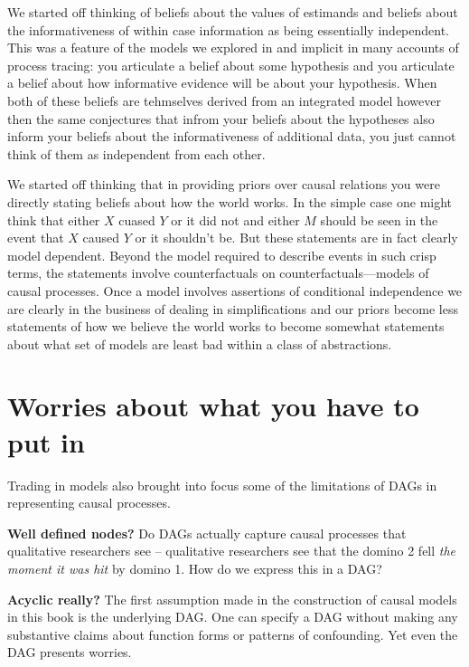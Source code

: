 \documentclass[12pt,]{book}
\begin{document}
We started off thinking of beliefs about the values of estimands and beliefs about the informativeness of within case information as being essentially independent. This was a feature of the models we explored in \citet{humphreys2015mixing} and implicit in many accounts of process tracing: you articulate a belief about some hypothesis and you articulate a belief about how informative evidence will be about your hypothesis. When both of these beliefs are tehmselves derived from an integrated model however then the same conjectures that infrom your beliefs about the hypotheses also inform your beliefs about the informativeness of additional data, you just cannot think of them as independent from each other.

We started off thinking that in providing priors over causal relations you were directly stating beliefs about how the world works. In the simple case one might think that either \(X\) cuased \(Y\) or it did not and either \(M\) should be seen in the event that \(X\) caused \(Y\) or it shouldn't be. But these statements are in fact clearly model dependent. Beyond the model required to describe events in such crisp terms, the statements involve counterfactuals on counterfactuals---models of causal processes. Once a model involves assertions of conditional independence we are clearly in the business of dealing in simplifications and our priors become less statements of how we believe the world works to become somewhat statements about what set of models are least bad within a class of abstractions.

\hypertarget{worries-about-what-you-have-to-put-in}{%
\section{Worries about what you have to put in}\label{worries-about-what-you-have-to-put-in}}

Trading in models also brought into focus some of the limitations of DAGs in representing causal processes.

\textbf{Well defined nodes?} Do DAGs actually capture causal processes that qualitative researchers see -- qualitative researchers see that the domino 2 fell \emph{the moment it was hit} by domino 1. How do we express this in a DAG?

\textbf{Acyclic really?} The first assumption made in the construction of causal models in this book is the underlying DAG. One can specify a DAG without making any substantive claims about function forms or patterns of confounding. Yet even the DAG presents worries.
\end{document}
